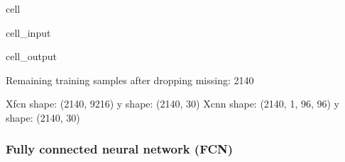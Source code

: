 \documentclass[letterpaper,10pt,english]{jupyterBook}
\begin{document}
\begin{sphinxuseclass}{cell}
\begin{sphinxVerbatimInput}
\begin{sphinxuseclass}{cell_input}
\begin{sphinxVerbatim}[commandchars=\\\{\}]
  \PYG{p}{[}\PYG{p}{[}\PYG{p}{]}\PYG{p}{]}  
  
   
   
\end{sphinxVerbatim}

\end{sphinxuseclass}\end{sphinxVerbatimInput}
\begin{sphinxVerbatimOutput}

\begin{sphinxuseclass}{cell_output}
\begin{sphinxVerbatim}[commandchars=\\\{\}]
Remaining training samples after dropping missing: 2140
\end{sphinxVerbatim}

\begin{sphinxVerbatim}[commandchars=\\\{\}]
X\PYGZus{}fcn shape: (2140, 9216) y shape: (2140, 30)
X\PYGZus{}cnn shape: (2140, 1, 96, 96) y shape: (2140, 30)
\end{sphinxVerbatim}

\end{sphinxuseclass}\end{sphinxVerbatimOutput}

\end{sphinxuseclass}

\subsubsection{Fully connected neural network (FCN)}
\label{\detokenize{04:fully-connected-neural-network-fcn}}
\end{document}

